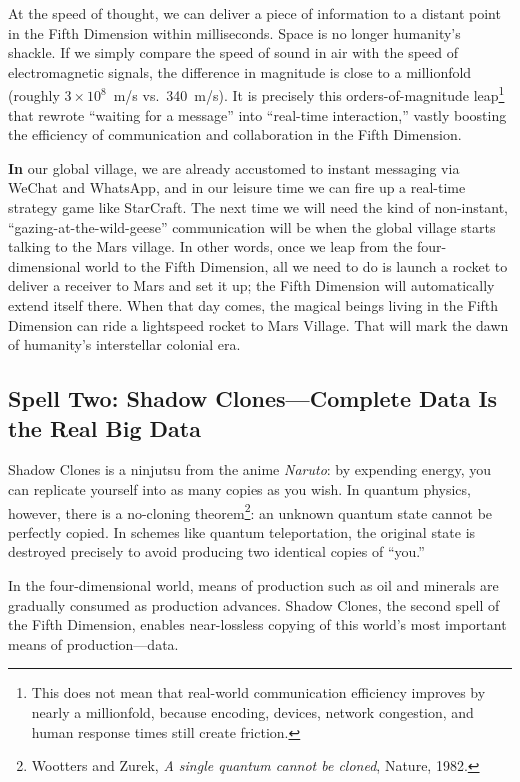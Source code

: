 \vspace{1em}

At the speed of thought, we can deliver a piece of information to a distant point in the Fifth Dimension within milliseconds. Space is no longer humanity's shackle. If we simply compare the speed of sound in air with the speed of electromagnetic signals, the difference in magnitude is close to a millionfold (roughly $3\times10^8$~m/s vs.\ 340~m/s).
It is precisely this orders-of-magnitude leap\footnote{This does not mean that real-world communication efficiency improves by nearly a millionfold, because encoding, devices, network congestion, and human response times still create friction.} that rewrote ``waiting for a message'' into ``real-time interaction,'' vastly boosting the efficiency of communication and collaboration in the Fifth Dimension.

\newpage
\textbf{In} our global village, we are already accustomed to instant messaging via WeChat and WhatsApp, and in our leisure time we can fire up a real-time strategy game like StarCraft. The next time we will need the kind of non-instant, ``gazing-at-the-wild-geese'' communication will be when the global village starts talking to the Mars village. In other words, once we leap from the four-dimensional world to the Fifth Dimension, all we need to do is launch a rocket to deliver a receiver to Mars and set it up; the Fifth Dimension will automatically extend itself there. When that day comes, the magical beings living in the Fifth Dimension can ride a lightspeed rocket to Mars Village. That will mark the dawn of humanity's interstellar colonial era.

\subsection{Spell Two: Shadow Clones---Complete Data Is the Real Big Data}

Shadow Clones is a ninjutsu from the anime \textit{Naruto}: by expending energy, you can replicate yourself into as many copies as you wish.
In quantum physics, however, there is a no-cloning theorem\footnote{Wootters and Zurek, \textit{A single quantum cannot be cloned}, Nature, 1982.}: an unknown quantum state cannot be perfectly copied. In schemes like quantum teleportation, the original state is destroyed precisely to avoid producing two identical copies of ``you.''

\vspace{1em}

In the four-dimensional world, means of production such as oil and minerals are gradually consumed as production advances. Shadow Clones, the second spell of the Fifth Dimension, enables near-lossless copying of this world's most important means of production---data.

